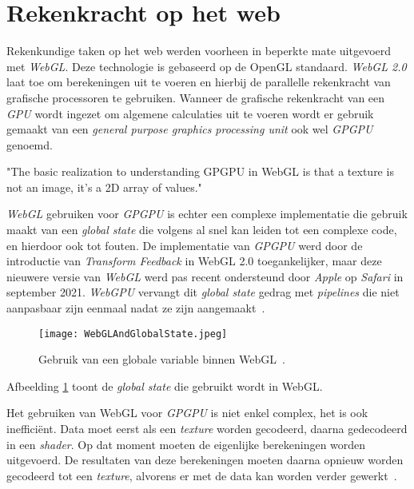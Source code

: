 \section{Rekenkracht op het web}
\label{sec:PowerOnWeb}

Rekenkundige taken op het web werden voorheen in beperkte mate uitgevoerd met \textit{WebGL}. Deze technologie is gebaseerd op de OpenGL standaard. \textit{WebGL 2.0} laat toe om berekeningen uit te voeren en hierbij de parallelle rekenkracht van grafische processoren te gebruiken. Wanneer de grafische rekenkracht van een \textit{GPU} wordt ingezet om algemene calculaties uit te voeren wordt er gebruik gemaakt van een \textit{general purpose graphics processing unit} ook wel \textit{GPGPU} genoemd.

\begin{displayquote}
    "The basic realization to understanding GPGPU in WebGL is that a texture is not an image, it's a 2D array of values."
\end{displayquote}

\textit{WebGL} gebruiken voor \textit{GPGPU} is echter een complexe implementatie die gebruik maakt van een \textit{global state} die volgens \textcite{Surma2022} al snel kan leiden tot een complexe code, en hierdoor ook tot fouten. De implementatie van \textit{GPGPU} werd door de introductie van \textit{Transform Feedback} in WebGL 2.0 toegankelijker, maar deze nieuwere versie van \textit{WebGL} werd pas recent ondersteund door \textit{Apple} op \textit{Safari} in september 2021. \textit{WebGPU} vervangt dit \textit{global state} gedrag met \textit{pipelines} die niet aanpasbaar zijn eenmaal nadat ze zijn aangemaakt~\autocite{Beaufort2023}.

\begin{figure}
    \texttt{[image: WebGLAndGlobalState.jpeg]}
    \caption[De \textit{Global State} in \textit{WebGL}~\autocite{GFXFundamentals2024}]{Gebruik van een globale variable binnen WebGL~\autocite{GFXFundamentals2024}.}
    \label{fig:WebGL Global State}
\end{figure}

\bigbreak{}

Afbeelding \ref{fig:WebGL Global State} toont de \textit{global state} die gebruikt wordt in WebGL.

\break{}

Het gebruiken van WebGL voor \textit{GPGPU} is niet enkel complex, het is ook inefficiënt. Data moet eerst als een \textit{texture} worden gecodeerd, daarna gedecodeerd in een \textit{shader}. Op dat moment moeten de eigenlijke berekeningen worden uitgevoerd. De resultaten van deze berekeningen moeten daarna opnieuw worden gecodeerd tot een \textit{texture}, alvorens er met de data kan worden verder gewerkt~\autocite{Surma2022}.

